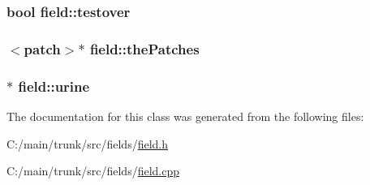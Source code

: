 \label{classfield_af985296d2be7e23cb70d38ca5e3da62c}
\hypertarget{classfield_a996fdf906e65192c69c7ab58bd47cd30}{
\subsubsection[{testover}]{\setlength{\rightskip}{0pt plus 5cm}bool {\bf field::testover}}}
\label{classfield_a996fdf906e65192c69c7ab58bd47cd30}
\hypertarget{classfield_a4a4d06d397563e9bd4031f92acaaacc6}{
\subsubsection[{thePatches}]{$<${\bf patch}$>$$\ast$ {\bf field::thePatches}}}
\label{classfield_a4a4d06d397563e9bd4031f92acaaacc6}
\hypertarget{classfield_a5651ea96e5367910b5753a22bafb374e}{
\subsubsection[{urine}]{$\ast$ {\bf field::urine}}}
\label{classfield_a5651ea96e5367910b5753a22bafb374e}


The documentation for this class was generated from the following files:\begin{DoxyCompactItemize}
\item 
C:/main/trunk/src/fields/\hyperlink{field_8h}{field.h}\item 
C:/main/trunk/src/fields/\hyperlink{field_8cpp}{field.cpp}\end{DoxyCompactItemize}
